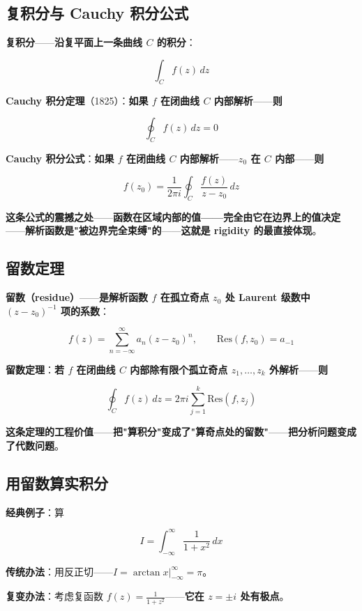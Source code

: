 \subsection{复积分与 Cauchy 积分公式}

\textbf{复积分}——\textbf{沿复平面上一条曲线 $C$ 的积分}：

\[
\int_C f(z)\, dz
\]

\textbf{Cauchy 积分定理}（1825）：\textbf{如果 $f$ 在闭曲线 $C$ 内部解析}——\textbf{则}

\[
\oint_C f(z)\, dz = 0
\]

\textbf{Cauchy 积分公式}：\textbf{如果 $f$ 在闭曲线 $C$ 内部解析}——\textbf{$z_0$ 在 $C$ 内部}——\textbf{则}

\[
f(z_0) = \frac{1}{2\pi i} \oint_C \frac{f(z)}{z - z_0}\, dz
\]

\textbf{这条公式的震撼之处}——\textbf{函数在区域\textbf{内部}的值——完全由它在\textbf{边界}上的值决定}——\textbf{解析函数是"被边界完全束缚"的}——\textbf{这就是 rigidity 的最直接体现}。

\subsection{留数定理}

\textbf{留数（residue）}——\textbf{是解析函数 $f$ 在\textbf{孤立奇点 $z_0$} 处 Laurent 级数中 $(z-z_0)^{-1}$ 项的系数}：

\[
f(z) = \sum_{n=-\infty}^{\infty} a_n (z - z_0)^n, \qquad \text{Res}(f, z_0) = a_{-1}
\]

\textbf{留数定理}：\textbf{若 $f$ 在闭曲线 $C$ 内部除有限个孤立奇点 $z_1, \ldots, z_k$ 外解析}——\textbf{则}

\[
\boxed{\;\oint_C f(z)\, dz = 2\pi i \sum_{j=1}^{k} \text{Res}(f, z_j)\;}
\]

\textbf{这条定理的工程价值}——\textbf{把"算积分"变成了"算奇点处的留数"}——\textbf{把分析问题变成了代数问题}。

\subsection{用留数算实积分}

\textbf{经典例子}：算

\[
I = \int_{-\infty}^{\infty} \frac{1}{1 + x^2}\, dx
\]

\textbf{传统办法}：用反正切——$I = \arctan x \big|_{-\infty}^{\infty} = \pi$。

\textbf{复变办法}：考虑复函数 $f(z) = \frac{1}{1+z^2}$——\textbf{它在 $z = \pm i$ 处有极点}。

